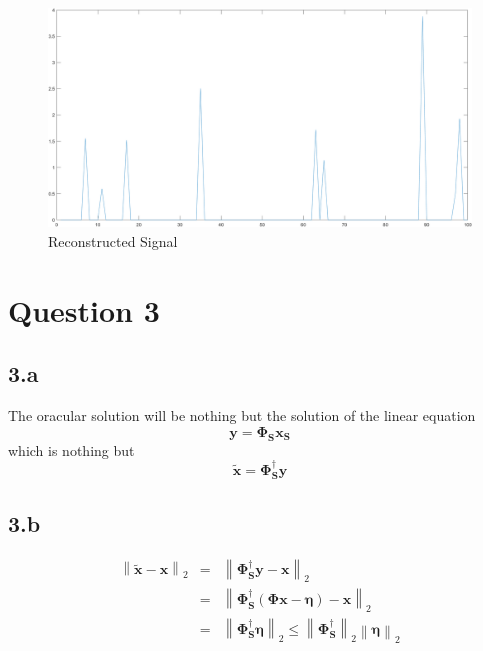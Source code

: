 \documentclass[12pt]{article}
\newcommand{\norm}[1]{\left\lVert #1 \right\rVert}
\begin{document}
\begin{figure}[H]
  \centering
  \includegraphics[scale=0.35]{rec_signal.png}  %
  \caption{Reconstructed Signal}
  \label{fig:7}
\end{figure}

\section*{Question 3}
\subsection*{3.a}
The oracular solution will be nothing but the solution of the linear equation
$$\boldsymbol{y} = \boldsymbol{\Phi_S} \boldsymbol{x_S}$$
which is nothing but
$$\boldsymbol{\tilde{x}} = \boldsymbol{\Phi_S^\dagger}\boldsymbol{y}$$
\subsection*{3.b}
\begin{eqnarray*}
\norm{\boldsymbol{\tilde{x}} - \boldsymbol{x}}_2 &=& \norm{\boldsymbol{\Phi_S^\dagger y - x}}_2\\
&=&\norm{\boldsymbol{\Phi_S^\dagger}(\boldsymbol{\Phi x - \eta}) - \boldsymbol{x}}_2\\
&=& \norm{\boldsymbol{\Phi_S^\dagger \eta}}_2 \leq \norm{\boldsymbol{\Phi_S^\dagger}}_2 \norm{\boldsymbol{\eta}}_2
\end{eqnarray*}
\end{document}
